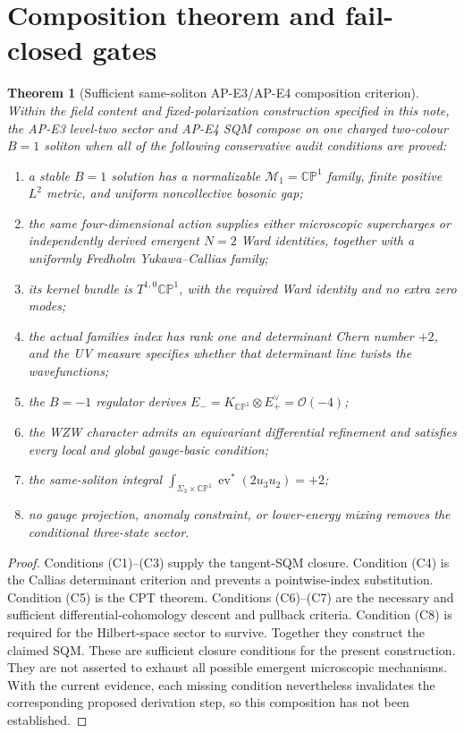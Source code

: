 \documentclass[11pt]{article}
\newtheorem{theorem}{Theorem}[section]
\theoremstyle{definition}
\theoremstyle{remark}
\newcommand{\CP}{\mathbb {CP}}
\newcommand{\cO}{\mathcal O}
\newcommand{\cM}{\mathcal M}
\begin{document}
\section{Composition theorem and fail-closed gates}

\begin{theorem}[Sufficient same-soliton AP-E3/AP-E4 composition criterion]
Within the field content and fixed-polarization construction specified in
this note, the AP-E3 level-two sector and AP-E4 SQM compose on one charged
two-colour \(B=1\) soliton when all of the following conservative audit
conditions are proved:
\begin{enumerate}[label=(C\arabic*)]
\item a stable \(B=1\) solution has a normalizable
  \(\cM_1=\CP^1\) family, finite positive \(L^2\) metric, and uniform
  noncollective bosonic gap;
\item the same four-dimensional action supplies either microscopic
  supercharges or independently derived emergent \(N=2\) Ward identities,
  together with a uniformly Fredholm Yukawa--Callias family;
\item its kernel bundle is \(T^{1,0}\CP^1\), with the required Ward identity
  and no extra zero modes;
\item the actual families index has rank one and determinant Chern number
  \(+2\), and the UV measure specifies whether that determinant line twists
  the wavefunctions;
\item the \(B=-1\) regulator derives
  \(E_-=K_{\CP^1}\otimes E_+^\vee=\cO(-4)\);
\item the WZW character admits an equivariant differential refinement and
  satisfies every local and global gauge-basic condition;
\item the same-soliton integral
  \(\int_{\Sigma_3\times\CP^1}\operatorname{ev}^*(2u_3u_2)=+2\);
\item no gauge projection, anomaly constraint, or lower-energy mixing removes
  the conditional three-state sector.
\end{enumerate}
\end{theorem}
\begin{proof}
Conditions (C1)--(C3) supply the tangent-SQM closure.  Condition (C4)
is the Callias determinant criterion and prevents a pointwise-index
substitution.  Condition (C5) is the CPT theorem.  Conditions (C6)--(C7) are
the necessary and sufficient differential-cohomology descent and pullback
criteria.  Condition (C8) is required for the Hilbert-space sector to survive.
Together they construct the claimed SQM.  These are sufficient closure
conditions for the present construction.  They are not asserted to exhaust
all possible emergent microscopic mechanisms.  With the current evidence,
each missing condition nevertheless invalidates the corresponding proposed
derivation step, so this composition has not been established.
\end{proof}
\end{document}
